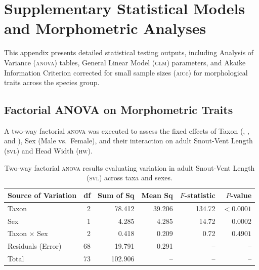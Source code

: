 
\chapter{Supplementary Statistical Models and Morphometric Analyses}
\label{app:stats}

This appendix presents detailed statistical testing outputs, including Analysis of Variance (\textsc{anova}) tables, General Linear Model (\textsc{glm}) parameters, and Akaike Information Criterion corrected for small sample sizes (\textsc{aic}c) for morphological traits across the  species group.

\section{Factorial ANOVA on Morphometric Traits}

A two-way factorial \textsc{anova} was executed to assess the fixed effects of Taxon (, , and ), Sex (Male vs.\ Female), and their interaction on adult Snout-Vent Length (\textsc{svl}) and Head Width (\textsc{hw}).

\begin{table}[htbp]
  \centering
  \small
  \caption{Two-way factorial \textsc{anova} results evaluating variation in adult Snout-Vent Length (\textsc{svl}) across taxa and sexes.}
  \label{tab:anova_svl}
  \begin{tabular}{lrrrrr}
    \toprule
    \textbf{Source of Variation} & \textbf{df} & \textbf{Sum of Sq} & \textbf{Mean Sq} & \textbf{$F$-statistic} & \textbf{$P$-value} \\
    \midrule
    Taxon & 2 & 78.412 & 39.206 & 134.72 & $< 0.0001$ \\
    Sex & 1 & 4.285 & 4.285 & 14.72 & $0.0002$ \\
    Taxon $\times$ Sex & 2 & 0.418 & 0.209 & 0.72 & $0.4901$ \\
    Residuals (Error) & 68 & 19.791 & 0.291 & -- & -- \\
    \midrule
    Total & 73 & 102.906 & -- & -- & -- \\
    \bottomrule
  \end{tabular}
\end{table}

